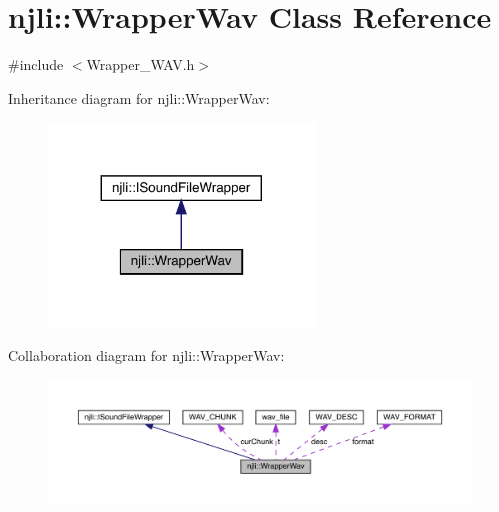 \hypertarget{classnjli_1_1_wrapper_wav}{}\section{njli\+:\+:Wrapper\+Wav Class Reference}
\label{classnjli_1_1_wrapper_wav}


{\ttfamily \#include $<$Wrapper\+\_\+\+W\+A\+V.\+h$>$}



Inheritance diagram for njli\+:\+:Wrapper\+Wav\+:\nopagebreak
\begin{figure}[H]
\begin{center}
\leavevmode
\includegraphics[width=200pt]{classnjli_1_1_wrapper_wav__inherit__graph}
\end{center}
\end{figure}


Collaboration diagram for njli\+:\+:Wrapper\+Wav\+:\nopagebreak
\begin{figure}[H]
\begin{center}
\leavevmode
\includegraphics[width=350pt]{classnjli_1_1_wrapper_wav__coll__graph}
\end{center}
\end{figure}
